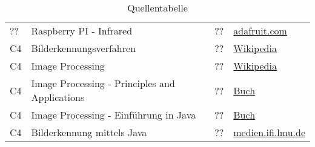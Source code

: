 \begin{table}[h!]
\begin{tabular}{l l l l}
        ?? & Raspberry PI - Infrared & ?? & \href{https://learn.adafruit.com/using-an-ir-remote-with-a-raspberry-pi-media-center/overview}{adafruit.com} \\
        
        C4 & Bilderkennungsverfahren & ?? & \href{http://en.wikipedia.org/wiki/Outline_of_object_recognition}{Wikipedia} \\
        
        C4 & Image Processing & ?? & \href{http://en.wikipedia.org/wiki/Image_processing}{Wikipedia} \\
        
        C4 & Image Processing - Principles and Applications & ?? & \href{http://books.google.co.in/books?id=smBw4-xvfrIC&lpg=PP1&dq=image\%20processing\%20ajoy\%20ray&pg=PP1#v=onepage&q=&f=false}{Buch} \\
        
        C4 & Image Processing - Einführung in Java & ?? & \href{ http://imagingbook.com/}{Buch} \\
      
        C4 & Bilderkennung mittels Java & ?? & \href{https://www.medien.ifi.lmu.de/lehre/ss07/mt/mtB3b.pdf}{medien.ifi.lmu.de} \\

        
	\end{tabular}
	\caption{Quellentabelle}
	\label{tab:quelle}
\end{table}
